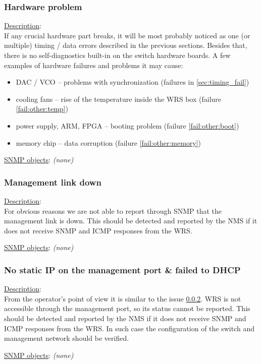\subsubsection{\bf Hardware problem}
		\begin{pck_descr}
			\item [] \underline{Description}:\\
				If any crucial hardware part breaks, it will be most probably noticed
				as one (or multiple) timing / data errors described in the previous
				sections. Besides that, there is no self-diagnostics built-in on the
				switch hardware boards. A few examples of hardware failures and problems
				it may cause:
				\begin{itemize}
					\item DAC / VCO -- problems with synchronization (failures in
						\ref{sec:timing_fail})
					\item cooling fans -- rise of the temperature inside the WRS box
						(failure \ref{fail:other:temp})
					\item power supply, ARM, FPGA -- booting problem (failure
						\ref{fail:other:boot})
					\item memory chip -- data corruption (failure \ref{fail:other:memory})
				\end{itemize}
			\item [] \underline{SNMP objects}: \emph{(none)}
		\end{pck_descr}

\subsubsection{\bf Management link down}
		\label{fail:other:management_link}
		\begin{pck_descr}
			\item [] \underline{Description}:\\
				For obvious reasons we are not able to report through SNMP that the
				management link is down. This should be detected and reported by the NMS
				if it does not receive SNMP and ICMP responses from the WRS.
			\item [] \underline{SNMP objects}: \emph{(none)}
		\end{pck_descr}

\subsubsection{\bf No static IP on the management port \& failed to DHCP}
		\begin{pck_descr}
			\item [] \underline{Description}:\\
				From the operator's point of view it is similar to the issue
				\ref{fail:other:management_link}. WRS is not accessible through the
				management port, so its status cannot be reported. This should be
				detected and reported by the NMS if it does not receive SNMP and ICMP
				responses from the WRS. In such case the configuration of the switch and
				management network should be verified.
			\item [] \underline{SNMP objects}: \emph{(none)}
		\end{pck_descr}

